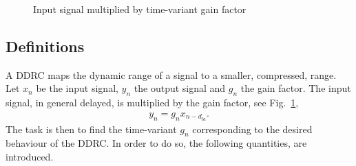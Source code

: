 \documentclass[../main2.tex]{subfiles}
\providecommand{\rootdir}{..}
\begin{document}
\begin{figure}[h]
\centerline{}
\caption{Input signal multiplied by time-variant gain factor}
\label{fig:block_gain}
\end{figure}
\subsection{Definitions}\label{theory_definitions}
A DDRC maps the dynamic range of a signal to a smaller, compressed, range. Let $x_n$ be the input signal, $y_n$ the output signal and $g_n$ the gain factor. The input signal, in general delayed, is multiplied by the gain factor, see Fig.~\ref{fig:block_gain},
\begin{align}
y_n = g_nx_{n-d_{la}}.
\label{eq:gainfactor}
\end{align}
The task is then to find the time-variant $g_n$ corresponding to the desired behaviour of the DDRC. In order to do so, the following quantities, are introduced.%
\end{document}
